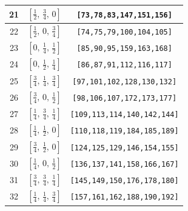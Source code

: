 \documentclass[fleqn,8pt]{jsarticle}
\begin{document}
\begin{longtable}{ccc}
21 & $\left[ \frac{1}{2},\, \frac{3}{4},\, 0 \right]$ & {\tt [73,78,83,147,151,156]} \\ \hline
22 & $\left[ \frac{1}{2},\, 0,\, \frac{3}{4} \right]$ & {\tt [74,75,79,100,104,105]} \\ \hline
23 & $\left[ 0,\, \frac{1}{4},\, \frac{1}{2} \right]$ & {\tt [85,90,95,159,163,168]} \\ \hline
24 & $\left[ 0,\, \frac{1}{2},\, \frac{1}{4} \right]$ & {\tt [86,87,91,112,116,117]} \\ \hline
25 & $\left[ \frac{3}{4},\, \frac{1}{4},\, \frac{3}{4} \right]$ & {\tt [97,101,102,128,130,132]} \\ \hline
26 & $\left[ \frac{3}{4},\, 0,\, \frac{1}{2} \right]$ & {\tt [98,106,107,172,173,177]} \\ \hline
27 & $\left[ \frac{1}{4},\, \frac{3}{4},\, \frac{1}{4} \right]$ & {\tt [109,113,114,140,142,144]} \\ \hline
28 & $\left[ \frac{1}{4},\, \frac{1}{2},\, 0 \right]$ & {\tt [110,118,119,184,185,189]} \\ \hline
29 & $\left[ \frac{3}{4},\, \frac{1}{2},\, 0 \right]$ & {\tt [124,125,129,146,154,155]} \\ \hline
30 & $\left[ \frac{1}{4},\, 0,\, \frac{1}{2} \right]$ & {\tt [136,137,141,158,166,167]} \\ \hline
31 & $\left[ \frac{3}{4},\, \frac{3}{4},\, \frac{1}{4} \right]$ & {\tt [145,149,150,176,178,180]} \\ \hline
32 & $\left[ \frac{1}{4},\, \frac{1}{4},\, \frac{3}{4} \right]$ & {\tt [157,161,162,188,190,192]} \\
\end{longtable}
\renewcommand{\arraystretch}{1.2}
\end{document}
